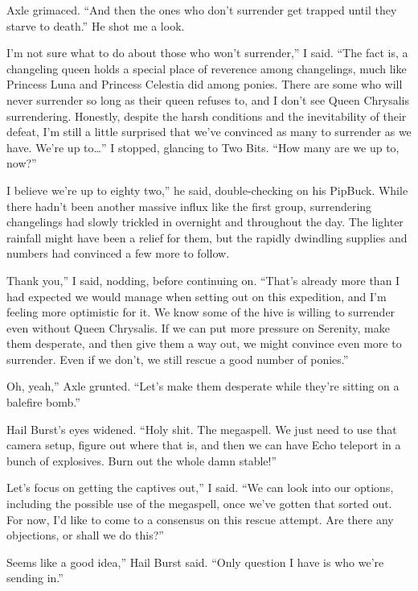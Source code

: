 Axle grimaced. “And then the ones who don’t surrender get trapped until they starve to death.” He shot me a look.

\leavevmode{}I’m not sure what to do about those who won’t surrender,” I said. “The fact is, a changeling queen holds a special place of reverence among changelings, much like Princess Luna and Princess Celestia did among ponies. There are some who will never surrender so long as their queen refuses to, and I don’t see Queen Chrysalis surrendering. Honestly, despite the harsh conditions and the inevitability of their defeat, I’m still a little surprised that we’ve convinced as many to surrender as we have. We’re up to…” I stopped, glancing to Two Bits. “How many are we up to, now?”

\leavevmode{}I believe we’re up to eighty two,” he said, double-checking on his PipBuck. While there hadn’t been another massive influx like the first group, surrendering changelings had slowly trickled in overnight and throughout the day. The lighter rainfall might have been a relief for them, but the rapidly dwindling supplies and numbers had convinced a few more to follow.

\leavevmode{}Thank you,” I said, nodding, before continuing on. “That’s already more than I had expected we would manage when setting out on this expedition, and I’m feeling more optimistic for it. We know some of the hive is willing to surrender even without Queen Chrysalis. If we can put more pressure on Serenity, make them desperate, and then give them a way out, we might convince even more to surrender. Even if we don’t, we still rescue a good number of ponies.”

\leavevmode{}Oh, yeah,” Axle grunted. “Let’s make them desperate while they’re sitting on a balefire bomb.”

Hail Burst’s eyes widened. “Holy shit. The megaspell. We just need to use that camera setup, figure out where that is, and then we can have Echo teleport in a bunch of explosives. Burn out the whole damn stable!”

\leavevmode{}Let’s focus on getting the captives out,” I said. “We can look into our options, including the possible use of the megaspell, once we’ve gotten that sorted out. For now, I’d like to come to a consensus on this rescue attempt. Are there any objections, or shall we do this?”

\leavevmode{}Seems like a good idea,” Hail Burst said. “Only question I have is who we’re sending in.”


